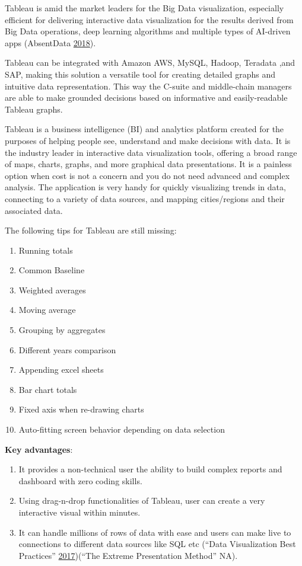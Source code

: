 \documentclass[]{book}
\providecommand{\tightlist}{%
  \setlength{\itemsep}{0pt}\setlength{\parskip}{0pt}}
\theoremstyle{definition}
\theoremstyle{definition}
\theoremstyle{definition}
\theoremstyle{remark}
\begin{document}
Tableau is amid the market leaders for the Big Data visualization,
especially efficient for delivering interactive data visualization for
the results derived from Big Data operations, deep learning algorithms
and multiple types of AI-driven apps (AbsentData
\protect\hyperlink{ref-tableau_interactive_viz}{2018}).

Tableau can be integrated with Amazon AWS, MySQL, Hadoop, Teradata ,and
SAP, making this solution a versatile tool for creating detailed graphs
and intuitive data representation. This way the C-suite and middle-chain
managers are able to make grounded decisions based on informative and
easily-readable Tableau graphs.

Tableau is a business intelligence (BI) and analytics platform created
for the purposes of helping people see, understand and make decisions
with data. It is the industry leader in interactive data visualization
tools, offering a broad range of maps, charts, graphs, and more
graphical data presentations. It is a painless option when cost is not a
concern and you do not need advanced and complex analysis. The
application is very handy for quickly visualizing trends in data,
connecting to a variety of data sources, and mapping cities/regions and
their associated data.

The following tips for Tableau are still missing:

\begin{enumerate}
\def\labelenumi{\arabic{enumi}.}
\tightlist
\item
  Running totals
\item
  Common Baseline
\item
  Weighted averages
\item
  Moving average
\item
  Grouping by aggregates
\item
  Different years comparison
\item
  Appending excel sheets
\item
  Bar chart totals
\item
  Fixed axis when re-drawing charts
\item
  Auto-fitting screen behavior depending on data selection
\end{enumerate}

\textbf{Key advantages}:

\begin{enumerate}
\def\labelenumi{\arabic{enumi}.}
\tightlist
\item
  It provides a non-technical user the ability to build complex reports
  and dashboard with zero coding skills.
\item
  Using drag-n-drop functionalities of Tableau, user can create a very
  interactive visual within minutes.
\item
  It can handle millions of rows of data with ease and users can make
  live to connections to different data sources like SQL etc (``Data
  Visualization Best Practices''
  \protect\hyperlink{ref-VizBP}{2017})(``The Extreme Presentation
  Method'' NA).
\end{enumerate}
\end{document}
